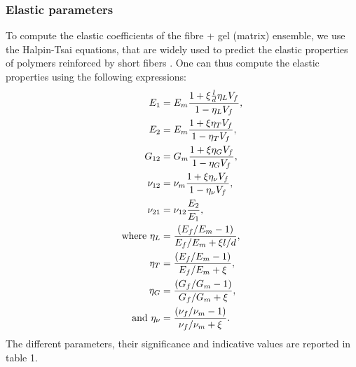 \documentclass[]{article}
\begin{document}
\subsubsection{Elastic parameters}
To compute the elastic coefficients of the fibre + gel (matrix) ensemble, we use the Halpin-Tsai equations, that are widely used to predict the elastic properties of polymers reinforced by short fibers \citep{halpin76,abrate86}. One can thus compute the elastic properties using the following expressions:
\begin{align}
	E_1 &= E_m \frac{1+\xi \frac{l}{d} \eta_L V_f}{1-\eta_LV_f}, \nonumber \\
	E_2 &= E_m \frac{1+\xi \eta_T V_f}{1-\eta_TV_f},  \nonumber \\
	G_{12} &= G_m \frac{1+\xi \eta_G V_f}{1-\eta_GV_f}, \nonumber\\
	\nu_{12}&=  \nu_m \frac{1+\xi \eta_\nu V_f}{1-\eta_\nu V_f}, \nonumber\\
	\nu_{21}& = \nu_{12}\frac{E_2}{E_1},  \\
	{\rm where \  } \eta_L & = \frac{(E_f/E_m - 1)}{E_f/E_m + \xi l/d}, \nonumber\\
	\eta_T & = \frac{(E_f/E_m - 1)}{E_f/E_m + \xi }, \nonumber \\
	\eta_G & = \frac{(G_f/G_m - 1)}{G_f/G_m + \xi }, \nonumber \\
	{\rm and \  } \eta_\nu & = \frac{(\nu_f/\nu_m - 1)}{\nu_f/\nu_m + \xi }. \nonumber
\end{align}
The different parameters, their significance and indicative values are reported in table 1.
\end{document}
